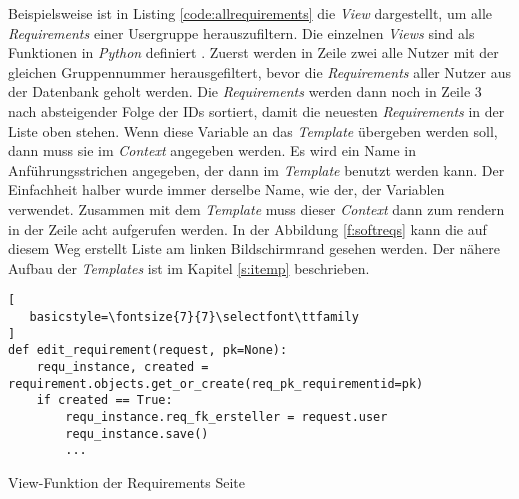 \documentclass[11pt,a4paper]{report}
\begin{document}
Beispielsweise ist in Listing \ref{code:allrequirements} die \textit{View} dargestellt, um alle \textit{Requirements} einer Usergruppe herauszufiltern. Die einzelnen \textit{Views} sind als Funktionen in \textit{Python} definiert \cite{mozillatuto1}. Zuerst werden in Zeile zwei alle Nutzer mit der gleichen Gruppennummer herausgefiltert, bevor die \textit{Requirements} aller Nutzer aus der Datenbank geholt werden. Die \textit{Requirements} werden dann noch in Zeile 3 nach absteigender Folge der IDs sortiert, damit die neuesten \textit{Requirements} in der Liste oben stehen. Wenn diese Variable an das \textit{Template} übergeben werden soll, dann muss sie im \textit{Context} angegeben werden. Es wird ein Name in Anführungsstrichen angegeben, der dann im \textit{Template} benutzt werden kann. Der Einfachheit halber wurde immer derselbe Name, wie der, der Variablen verwendet. Zusammen mit dem \textit{Template} muss dieser \textit{Context} dann zum rendern in der Zeile acht aufgerufen werden. In der Abbildung \ref{f:softreqs} kann die auf diesem Weg erstellt Liste am linken Bildschirmrand gesehen werden. Der nähere Aufbau der \textit{Templates} ist im Kapitel \ref{s:itemp} beschrieben.




\begin{listing}[htbp]
\begin{lstlisting}[
   basicstyle=\fontsize{7}{7}\selectfont\ttfamily
]
def edit_requirement(request, pk=None):
    requ_instance, created = requirement.objects.get_or_create(req_pk_requirementid=pk)
    if created == True:
        requ_instance.req_fk_ersteller = request.user
        requ_instance.save()
        ...
\end{lstlisting}
\caption{View-Funktion der Requirements Seite}
\label{code:editreq}
\end{listing}
\end{document}
